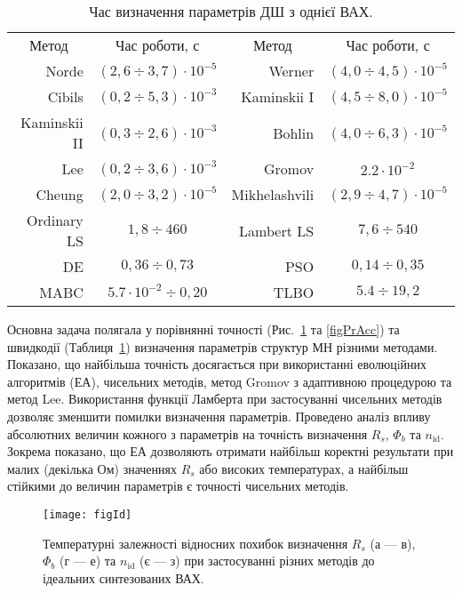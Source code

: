 \documentclass[a5paper,10pt,twoside,openany,article]{memoir} %
\begin{document}
\begin{table}[b]
\caption{\label{tabRT}Час визначення параметрів ДШ з однієї ВАХ.}                        
\centering
\begin{tabular}{|r|c|r|c|}
\hline
\multicolumn{1}{|c|}{Метод}&Час роботи, с &\multicolumn{1}{|c|}{Метод}&Час роботи, с\\ \hhline{|====|}
Norde &$(2,6\div3,7)\cdot10^{-5}$& Werner  &$(4,0\div4,5)\cdot10^{-5}$\\ \hline
Cibils  &$(0,2\div5,3)\cdot10^{-3}$& Kaminskii I &$(4,5\div8,0)\cdot10^{-5}$\\ \hline
Kaminskii II &$(0,3\div2,6)\cdot10^{-3}$& Bohlin &$(4,0\div6,3)\cdot10^{-5}$\\ \hline
Lee &$(0,2\div3,6)\cdot10^{-3}$& Gromov &$2.2\cdot10^{-2}$\\ \hline
Cheung &$(2,0\div3,2)\cdot10^{-5}$&Mikhelashvili &$(2,9\div4,7)\cdot10^{-5}$\\ \hline
Ordinary LS &$1,8\div460$&Lambert LS &$7,6\div540$\\ \hline
DE &$0,36\div0,73$&PSO &$0,14\div0,35$\\ \hline
MABC &$5.7\cdot10^{-2}\div0,20$&TLBO &$5.4\div19,2$ \\
\hline
\end{tabular}
\end{table}

Основна задача полягала у порівнянні точності (Рис.~\ref{figId} та \ref{figPrAcc}) та швидкодії (Таблиця~\ref{tabRT}) визначення параметрів структур МН різними методами.
Показано, що найбільша точність досягається при використанні еволюцiйних алгоритмів (ЕА), чисельних методів, метод Gromov з адаптивною процедурою та метод Lee.
Використання функції Ламберта при застосуванні чисельних методів дозволяє зменшити помилки визначення параметрів.
Проведено аналіз впливу абсолютних величин кожного з параметрів на точність визначення $R_s$, $\Phi_b$ та $n_\mathrm{id}$.
Зокрема показано, що ЕА дозволяють отримати найбільш коректні результати при малих (декілька Ом) значеннях $R_s$ або високих температурах, а найбільш стійкими до величин параметрів є точності чисельних методів.


\begin{figure}
\center
\texttt{[image: figId]}%
\caption{\label{figId}
Температурні залежності відносних похибок визначення $R_s$ (а --- в), $\Phi_b$ (г --- е) та $n_\mathrm{id}$ (є --- з) при застосуванні різних методів до ідеальних синтезованих ВАХ.
}
\end{figure}
\end{document}
